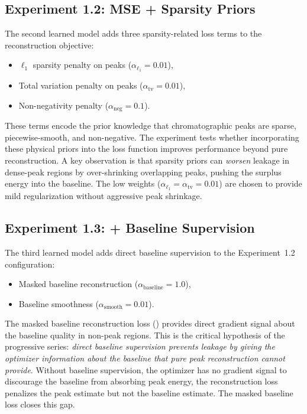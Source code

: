 \subsection{Experiment 1.2: MSE + Sparsity Priors}
\label{sec:exp_1_2}

The second learned model adds three sparsity-related loss terms to the reconstruction objective:
\begin{itemize}
    \item $\ell_1$ sparsity penalty on peaks ($\alpha_{\ell_1} = 0.01$),
    \item Total variation penalty on peaks ($\alpha_{\text{tv}} = 0.01$),
    \item Non-negativity penalty ($\alpha_{\text{neg}} = 0.1$).
\end{itemize}

These terms encode the prior knowledge that chromatographic peaks are sparse, piecewise-smooth, and non-negative. The experiment tests whether incorporating these physical priors into the loss function improves performance beyond pure reconstruction. A key observation is that sparsity priors can \emph{worsen} leakage in dense-peak regions by over-shrinking overlapping peaks, pushing the surplus energy into the baseline. The low weights ($\alpha_{\ell_1} = \alpha_{\text{tv}} = 0.01$) are chosen to provide mild regularization without aggressive peak shrinkage.


\subsection{Experiment 1.3: + Baseline Supervision}
\label{sec:exp_1_3}

The third learned model adds direct baseline supervision to the Experiment~1.2 configuration:
\begin{itemize}
    \item Masked baseline reconstruction ($\alpha_{\text{baseline}} = 1.0$),
    \item Baseline smoothness ($\alpha_{\text{smooth}} = 0.01$).
\end{itemize}

The masked baseline reconstruction loss () provides direct gradient signal about the baseline quality in non-peak regions. This is the critical hypothesis of the progressive series: \emph{direct baseline supervision prevents leakage by giving the optimizer information about the baseline that pure peak reconstruction cannot provide}. Without baseline supervision, the optimizer has no gradient signal to discourage the baseline from absorbing peak energy, the reconstruction loss penalizes the peak estimate but not the baseline estimate. The masked baseline loss closes this gap.


